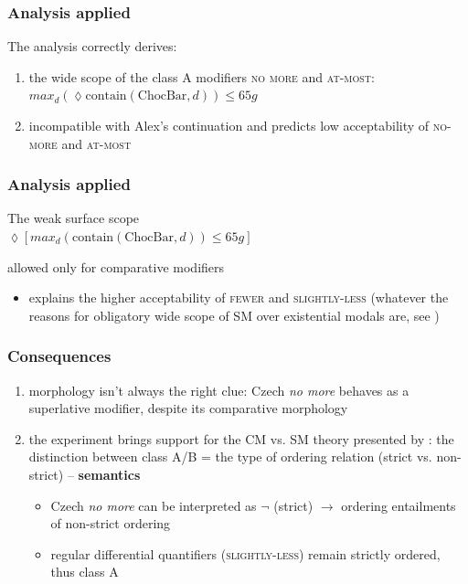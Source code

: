 \documentclass[10pt
]{beamer}
\newcommand{\cond}[1]{\textsc{#1}}
\begin{document}
\begin{frame}
  \frametitle{Analysis applied}


  The analysis correctly derives:
  
  \begin{enumerate}
    \item the wide scope of the class A modifiers \cond{no more} and \cond{at-most}:\\
    
    
    \ex $max_d(\lozenge \mathrm{contain}(\mathrm{ChocBar},d)) \leq 65g$
    \xe

    \item incompatible with Alex's continuation and predicts low acceptability of \cond{no-more} and \cond{at-most}
  \end{enumerate}

\end{frame}

\begin{frame}
  \frametitle{Analysis applied}

  The weak surface scope\\
  
  \ex $\lozenge[max_d(\mathrm{contain}(\mathrm{ChocBar},d)) \leq 65g]$
  \xe

  allowed only for comparative modifiers
  
\begin{itemize}
  \item explains the higher acceptability of \cond{fewer} and
  \cond{slightly-less} (whatever the reasons for obligatory wide scope of SM over existential modals are, see \cite{blok2019scope})
\end{itemize}
  
\end{frame}

\begin{frame}
  \frametitle{Consequences}

\begin{enumerate}
  \item morphology isn't always the right clue: Czech \textit{no more} behaves as a superlative modifier, despite its comparative morphology
  \item the experiment brings support for the CM vs. SM theory presented by \cite{kennedy2015fregean}: the distinction between class A/B = the type of ordering relation (strict vs. non-strict) -- \textbf{semantics}

  \begin{itemize}
    \item Czech \textit{no more} can be interpreted as $\neg$ (strict) $\rightarrow$ ordering entailments of non-strict ordering
    \item regular differential quantifiers (\cond{slightly-less}) remain strictly ordered, thus class A
  \end{itemize}

\end{enumerate}

\end{frame}
\end{document}
